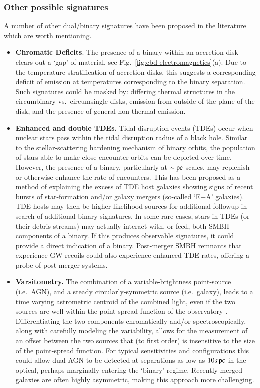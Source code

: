 \documentclass[onecolumn,authoryear]{els-mrw}
\begin{document}
\subsubsection{Other possible signatures}\label{sec:ems_other}

A number of other dual/binary signatures have been proposed in the literature which are worth mentioning.
\begin{itemize}
    \item \textbf{Chromatic Deficits}.  The presence of a binary within an accretion disk clears out a `gap' of material, see Fig.~\ref{fig:cbd-electromagnetics}(a).  Due to the temperature stratification of accretion disks, this suggests a corresponding deficit of emission at temperatures corresponding to the binary separation.  Such signatures could be masked by: differing thermal structures in the circumbinary vs.~circumsingle disks, emission from outside of the plane of the disk, and the presence of general non-thermal emission.
    \item \textbf{Enhanced and double TDEs.}  Tidal-disruption events (TDEs) occur when nuclear stars pass within the tidal disruption radius of a black hole.  Similar to the stellar-scattering hardening mechanism of binary orbits, the population of stars able to make close-encounter orbits can be depleted over time.  However, the presence of a binary, particularly at $\sim \mathrm{pc}$ scales, may replenish or otherwise enhance the rate of encounters.  This has been proposed as a method of explaining the excess of TDE host galaxies showing signs of recent bursts of star-formation and/or galaxy mergers (so-called `E+A' galaxies).  TDE hosts may then be higher-likelihood sources for additional followup in search of additional binary signatures.  In some rare cases, stars in TDEs (or their debris streams) may actually interact-with, or feed, both SMBH components of a binary.  If this produces observable signatures, it could provide a direct indication of a binary.  Post-merger SMBH remnants that experience GW recoils could also experience enhanced TDE rates, offering a probe of post-merger systems.
    \item \textbf{Varsitometry.} The combination of a variable-brightness point-source (i.e.~AGN), and a steady circularly-symmetric source (i.e.~galaxy), leads to a time varying astrometric centroid of the combined light, even if the two sources are well within the point-spread function of the observatory \citep{Shen+2019}.  Differentiating the two components chromatically and/or spectroscopically, along with carefully modeling the variability, allows for the measurement of an offset between the two sources that (to first order) is insensitive to the size of the point-spread function.  For typical sensitivities and configurations this could allow dual AGN to be detected at separations as low as $10s \, \mathrm{pc}$ in the optical, perhaps marginally entering the `binary' regime.  Recently-merged galaxies are often highly asymmetric, making this approach more challenging.

\end{itemize}
\end{document}
